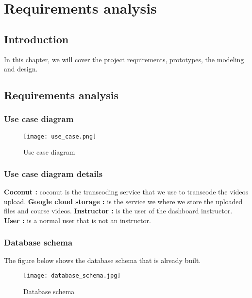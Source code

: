 \chapter{Requirements analysis}
\newpage
\section*{Introduction}
In this chapter, we will cover the project requirements, prototypes, the modeling and design.
\section{Requirements analysis}

\subsection{Use case diagram}

\begin{figure}[!ht]
    \centering
    \texttt{[image: use\_case.png]}
    \caption{Use case diagram}
    \label{fig:use_case}
\end{figure}


\subsection{Use case diagram details}
\hfill \break
\textbf{Coconut :} coconut is the transcoding service that we use to transcode the videos upload.
\hfill \break
\textbf{Google cloud storage :} is the service we where we store the uploaded files and course videos.
\hfill \break
\textbf{Instructor :} is the user of the dashboard instructor.
\hfill \break
\textbf{User :} is a normal user that is not an instructor.
 

\subsection{Database schema}

The figure below shows the database schema that is already built.

\begin{figure}[!ht]
    \centering
    \texttt{[image: database\_schema.jpg]}
    \caption{Database schema}
    \label{fig:database_schema}
\end{figure}


